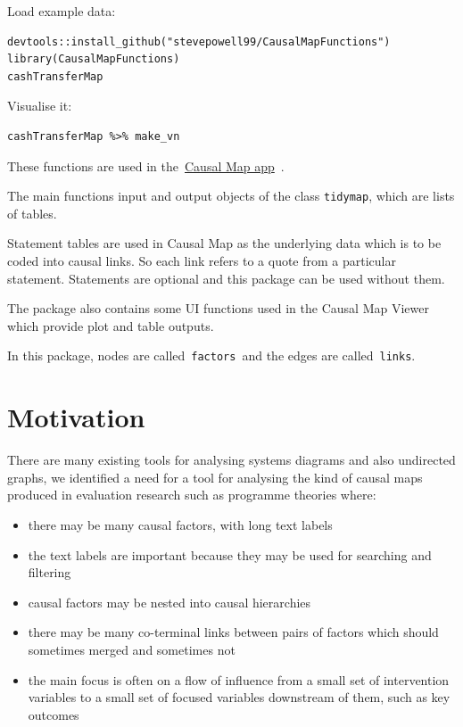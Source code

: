 \documentclass[
]{book}
\providecommand{\tightlist}{%
  \setlength{\itemsep}{0pt}\setlength{\parskip}{0pt}}
\begin{document}
Load example data:

\begin{verbatim}
devtools::install_github("stevepowell99/CausalMapFunctions")
library(CausalMapFunctions)
cashTransferMap
\end{verbatim}

Visualise it:

\begin{verbatim}
cashTransferMap %>% make_vn
\end{verbatim}

These functions are used in the~\href{https://causalmap.app/}{Causal Map app}~.

The main functions input and output objects of the class \texttt{tidymap}, which are lists of tables.

Statement tables are used in Causal Map as the underlying data which is to be coded into causal links. So each link refers to a quote from a particular statement. Statements are optional and this package can be used without them.

The package also contains some UI functions used in the Causal Map Viewer which provide plot and table outputs.

In this package, nodes are called~\texttt{factors}~and the edges are called~\texttt{links}.

\hypertarget{motivation}{%
\section{\texorpdfstring{\textbf{Motivation}}{Motivation}}\label{motivation}}

There are many existing tools for analysing systems diagrams and also undirected graphs, we identified a need for a tool for analysing the kind of causal maps produced in evaluation research such as programme theories where:

\begin{itemize}
\tightlist
\item
  there may be many causal factors, with long text labels
\item
  the text labels are important because they may be used for searching and filtering
\item
  causal factors may be nested into causal hierarchies
\item
  there may be many co-terminal links between pairs of factors which should sometimes merged and sometimes not
\item
  the main focus is often on a flow of influence from a small set of intervention variables to a small set of focused variables downstream of them, such as key outcomes
\end{itemize}
\end{document}
